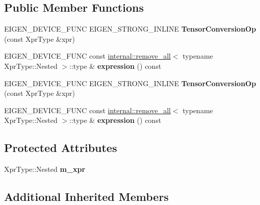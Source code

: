 \subsection*{Public Member Functions}
\begin{DoxyCompactItemize}
\item 
\mbox{\label{class_eigen_1_1_tensor_conversion_op_a851ec93ca1b52e50c682c9542bc79d6a}} 
E\+I\+G\+E\+N\+\_\+\+D\+E\+V\+I\+C\+E\+\_\+\+F\+U\+NC E\+I\+G\+E\+N\+\_\+\+S\+T\+R\+O\+N\+G\+\_\+\+I\+N\+L\+I\+NE {\bfseries Tensor\+Conversion\+Op} (const Xpr\+Type \&xpr)
\item 
\mbox{\label{class_eigen_1_1_tensor_conversion_op_a7b79894caee8c25e8280c9bd4d8c4b0a}} 
E\+I\+G\+E\+N\+\_\+\+D\+E\+V\+I\+C\+E\+\_\+\+F\+U\+NC const \hyperlink{struct_eigen_1_1internal_1_1remove__all}{internal\+::remove\+\_\+all}$<$ typename Xpr\+Type\+::\+Nested $>$\+::type \& {\bfseries expression} () const
\item 
\mbox{\label{class_eigen_1_1_tensor_conversion_op_a851ec93ca1b52e50c682c9542bc79d6a}} 
E\+I\+G\+E\+N\+\_\+\+D\+E\+V\+I\+C\+E\+\_\+\+F\+U\+NC E\+I\+G\+E\+N\+\_\+\+S\+T\+R\+O\+N\+G\+\_\+\+I\+N\+L\+I\+NE {\bfseries Tensor\+Conversion\+Op} (const Xpr\+Type \&xpr)
\item 
\mbox{\label{class_eigen_1_1_tensor_conversion_op_a7b79894caee8c25e8280c9bd4d8c4b0a}} 
E\+I\+G\+E\+N\+\_\+\+D\+E\+V\+I\+C\+E\+\_\+\+F\+U\+NC const \hyperlink{struct_eigen_1_1internal_1_1remove__all}{internal\+::remove\+\_\+all}$<$ typename Xpr\+Type\+::\+Nested $>$\+::type \& {\bfseries expression} () const
\end{DoxyCompactItemize}
\subsection*{Protected Attributes}
\begin{DoxyCompactItemize}
\item 
\mbox{\label{class_eigen_1_1_tensor_conversion_op_aaa47abd5b83f631335607d2a0f56d911}} 
Xpr\+Type\+::\+Nested {\bfseries m\+\_\+xpr}
\end{DoxyCompactItemize}
\subsection*{Additional Inherited Members}


